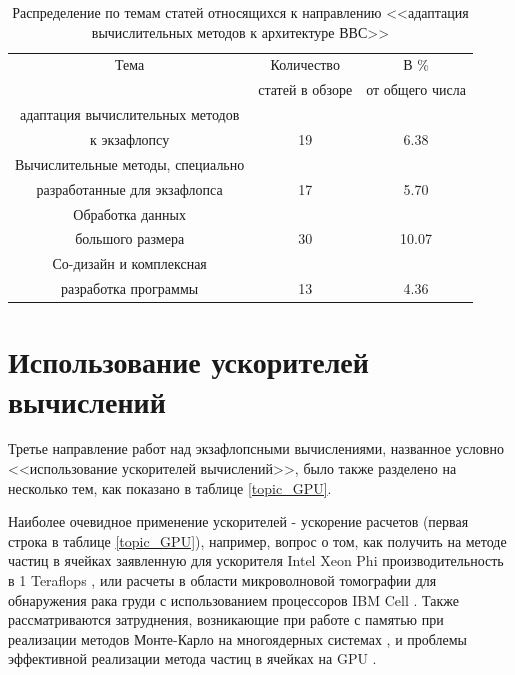\begin{table}[ht]
	\caption{Распределение по темам статей относящихся к направлению
		<<адаптация вычислительных методов к архитектуре ВВС>>}
	\begin{center}
		\begin{tabular}{|c|c|c|}
			\hline
			Тема                       & Количество          & В \%           \\
			& статей в обзоре     & от общего числа  \\ \hline 
			адаптация вычислительных методов   &   & \\
			к экзафлопсу                       & 19 & 6.38  \\ \hline 
			Вычислительные методы, специально & & \\
			разработанные для экзафлопса & 17 & 5.70 \\ \hline 
			Обработка данных  & & \\
			большого размера  & 30 & 10.07 \\ \hline 
			Со-дизайн и комплексная        &    &     \\      
			разработка программы           & 13 & 4.36   \\  \hline 
			
		\end{tabular}
	\end{center}
	\label{topic_special}
\end{table}

\clearpage

\section{Использование ускорителей вычислений}

Третье направление работ над экзафлопсными вычислениями, названное условно <<использование ускорителей вычислений>>, было также разделено на несколько тем, как показано в таблице \ref{topic_GPU}.

Наиболее очевидное применение ускорителей - ускорение расчетов (первая строка в таблице \ref{topic_GPU}), например, вопрос о том, как получить на методе частиц в ячейках заявленную для ускорителя Intel Xeon Phi производительность в 1 Teraflops \cite{Nakashima2015}, или расчеты в области микроволновой томографии для обнаружения рака груди с использованием процессоров IBM Cell \cite{Xu20121106}. Также рассматриваются затруднения, возникающие при работе с памятью при реализации методов Монте-Карло на многоядерных системах \cite{Tramm2015195}, и проблемы эффективной реализации метода частиц в ячейках на GPU \cite{Gong2012588,Kong2011,Safi20151290}.

